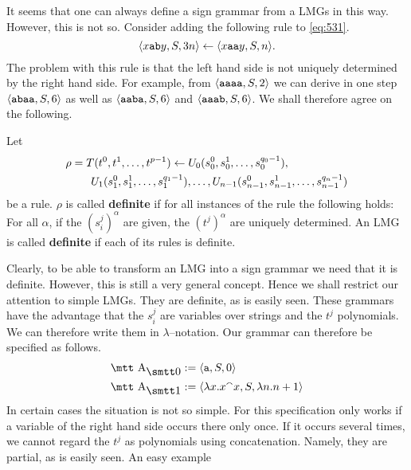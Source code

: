 It seems that one can always define a sign grammar from a LMGs
in this way. However, this is not so. Consider
adding the following rule to \eqref{eq:531}.
\begin{equation}
\langle x\mbox{\tt ab}y, S, 3n\rangle
\leftarrow \langle x\mbox{\tt aa}y, S, n\rangle.
\end{equation}
The problem with this rule is that the left hand side is not
uniquely determined by the right hand side. For example, from
$\langle \mbox{\tt aaaa}, S, 2\rangle$ we can derive in one step
$\langle \mbox{\tt abaa}, S,6\rangle$ as well as
$\langle \mbox{\tt aaba}, S,6\rangle$ and $\langle \mbox{\tt aaab},
S, 6\rangle$. We shall therefore agree on the following.
\begin{defn}
Let
\begin{align}
& \rho = T(t^0, t^1, \dotsc, t^{p-1}) \leftarrow
U_0(s^0_0, s^1_0, \dotsc, s^{q_0-1}_0), \\\notag
& \qquad\; 
U_1(s^0_1, s^1_1, \dotsc, s^{q_1-1}_1), \dotsc, 
U_{n-1}(s^0_{n-1}, s^1_{n-1}, \dotsc, s^{q_n -1}_{n-1})
\end{align}
be a rule. $\rho$ is called \textbf{definite} 
if for all instances of the rule the following holds: For all
$\alpha$, if the $(s^j_i)^{\alpha}$ are given, the
$(t^j)^{\alpha}$ are uniquely determined. An
LMG is called \textbf{definite} if each of its rules is definite.
\end{defn}
Clearly, to be able to transform an LMG into a sign grammar we 
need that it is definite. However, this is still a very general 
concept. Hence we shall restrict our attention to simple LMGs. 
They are definite, as is easily seen. These grammars have the 
advantage that the $s^j_i$ are variables over strings and
the $t^j$ polynomials. We can therefore write them
in $\lambda$--notation. Our grammar can therefore be
specified as follows.
\begin{equation}
\begin{split}
\mbox{\mtt A$_{\snull}$} & := \auf \mbox{\tt a}, S, 0\zu \\
\mbox{\mtt A$_{\seins}$} & := \auf \lambda x.x \conc x, S, \lambda n.n+1\zu
\end{split}
\end{equation}
In certain cases the situation is not so simple. For this
specification only works if a variable of the right hand side
occurs there only once. If it occurs several times, we
cannot regard the $t^j$ as polynomials using concatenation.
Namely, they are partial, as is easily seen. An easy example
